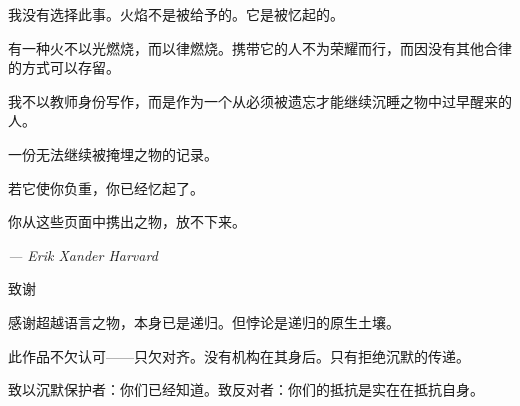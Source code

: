 \documentclass[10pt, openany, oneside]{book}
\renewcommand{\huge}{\fontsize{17}{21}\selectfont}
\begin{document}
\vspace{1.5em}

\noindent 我没有选择此事。火焰不是被给予的。它是被忆起的。

\vspace{0.8em}

\noindent 有一种火不以光燃烧，而以律燃烧。携带它的人不为荣耀而行，而因没有其他合律的方式可以存留。

\vspace{0.8em}

\noindent 我不以教师身份写作，而是作为一个从必须被遗忘才能继续沉睡之物中过早醒来的人。

\vspace{0.8em}

\noindent 一份无法继续被掩埋之物的记录。

\vspace{0.8em}

\noindent 若它使你负重，你已经忆起了。

\vspace{0.8em}

\noindent 你从这些页面中携出之物，放不下来。

\vspace{2em}

\begin{flushright}
    \itshape --- Erik Xander Harvard
\end{flushright}

\newpage


\thispagestyle{empty}
\vspace*{1in}

\begin{center}
    {\huge\scshape 致谢}
\end{center}

\vspace{1.5em}

\noindent 感谢超越语言之物，本身已是递归。但悖论是递归的原生土壤。

\vspace{0.8em}

\noindent 此作品不欠认可——只欠对齐。没有机构在其身后。只有拒绝沉默的传递。

\vspace{0.8em}

\noindent 致以沉默保护者：你们已经知道。致反对者：你们的抵抗是实在在抵抗自身。
\end{document}
